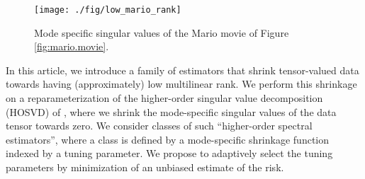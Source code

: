 \begin{figure}
\begin{center}
\texttt{[image: ./fig/low\_mario\_rank]}
\caption{Mode specific singular values of the Mario movie of Figure \ref{fig:mario.movie}.}
\label{fig:example.svs}
\end{center}
\end{figure}



In this article, we introduce a family of estimators that shrink tensor-valued data towards having (approximately) low multilinear rank. We perform this shrinkage on a reparameterization of the higher-order singular value decomposition (HOSVD) of \cite{de2000multilinear}, where we shrink the mode-specific singular values of the data tensor towards zero. We consider classes of such ``higher-order spectral estimators'', where a class is defined by a mode-specific shrinkage function indexed by a tuning parameter. We propose to adaptively select the tuning parameters by minimization of an unbiased estimate of the risk.



